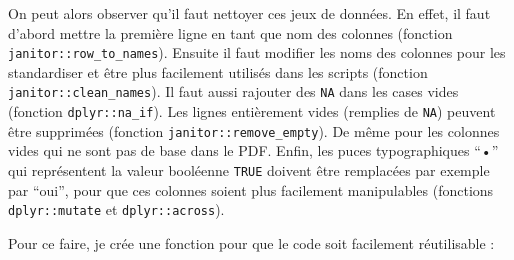 \documentclass[
  french,
]{book}
\begin{document}
On peut alors observer qu'il faut nettoyer ces jeux de données. En effet, il
faut d'abord mettre la première ligne en tant que nom des colonnes (fonction
\texttt{janitor::row\_to\_names}). Ensuite il faut modifier les noms des colonnes pour
les standardiser et être plus facilement utilisés dans les scripts (fonction
\texttt{janitor::clean\_names}). Il faut aussi rajouter des \texttt{NA} dans les cases vides
(fonction \texttt{dplyr::na\_if}). Les lignes entièrement vides (remplies de \texttt{NA})
peuvent être supprimées (fonction \texttt{janitor::remove\_empty}). De même pour les
colonnes vides qui ne sont pas de base dans le PDF. Enfin, les puces
typographiques ``•'' qui représentent la valeur booléenne \texttt{TRUE} doivent être
remplacées par exemple par ``oui'', pour que ces colonnes soient plus facilement
manipulables (fonctions \texttt{dplyr::mutate} et \texttt{dplyr::across}).

Pour ce faire, je crée une fonction pour que le code soit facilement
réutilisable :
\end{document}
